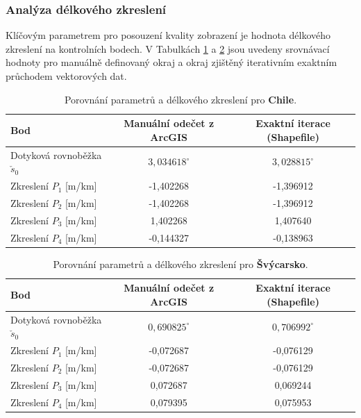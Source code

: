 \documentclass[12pt, a4paper]{article}
\begin{document}
\subsubsection{Analýza délkového zkreslení}
Klíčovým parametrem pro posouzení kvality zobrazení je hodnota délkového zkreslení na kontrolních bodech. V Tabulkách \ref{tab:zkresleni_chile} a \ref{tab:zkresleni_svycarsko} jsou uvedeny srovnávací hodnoty pro manuálně definovaný okraj a okraj zjištěný iterativním exaktním průchodem vektorových dat.


\clearpage
\newpage


\begin{table}[htbp]
    \centering
    \renewcommand{\arraystretch}{1.2}
    \begin{tabular}{|l|c|c|}
        \hline
        \textbf{Bod} & \textbf{Manuální odečet z ArcGIS} & \textbf{Exaktní iterace (Shapefile)} \\
        \hline
        Dotyková rovnoběžka $\check{s}_0$ & $3,034618^\circ$ & $3,028815^\circ$ \\
        \hline
        Zkreslení $P_1$  [m/km] & -1,402268 & -1,396912 \\
        Zkreslení $P_2$  [m/km] & -1,402268 & -1,396912 \\
        Zkreslení $P_3$  [m/km] & 1,402268 & 1,407640 \\
        Zkreslení $P_4$  [m/km] & -0,144327 & -0,138963 \\
        \hline
    \end{tabular}
    \caption{Porovnání parametrů a délkového zkreslení pro \textbf{Chile}.}
    \label{tab:zkresleni_chile}
\end{table}

\begin{table}[htbp]
    \centering
    \renewcommand{\arraystretch}{1.2}
    \begin{tabular}{|l|c|c|}
        \hline
        \textbf{Bod} & \textbf{Manuální odečet z ArcGIS} & \textbf{Exaktní iterace (Shapefile)} \\
        \hline
        Dotyková rovnoběžka $\check{s}_0$ & $0,690825^\circ$ & $0,706992^\circ$ \\
        \hline
        Zkreslení $P_1$  [m/km] & -0,072687 & -0,076129 \\
        Zkreslení $P_2$  [m/km] & -0,072687 & -0,076129 \\
        Zkreslení $P_3$  [m/km] & 0,072687 & 0,069244 \\
        Zkreslení $P_4$  [m/km] & 0,079395 & 0,075953 \\
        \hline
    \end{tabular}
    \caption{Porovnání parametrů a délkového zkreslení pro \textbf{Švýcarsko}.}
    \label{tab:zkresleni_svycarsko}
\end{table}
\end{document}
